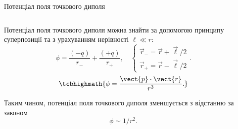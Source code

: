 \documentclass{beamer}
\begin{document}
\begin{frame}{Потенціал поля точкового диполя}{}
	\begin{columns}
		\begin{column}{0.7\linewidth}
			\begin{block}{}\justifying\small
				Потенціал поля точкового диполя можна знайти за допомогою принципу
				суперпозиції та з урахуванням нерівності $\ell \ll r$:
				\begin{equation*}
					\phi = \frac{(-q)}{r_-} +
					\frac{(+q)}{r_+}, \quad
					\begin{cases}
						\vec{r}_- =  \vec{r} + \vec{\ell}/2 \\
						\vec{r}_+ =  \vec{r} - \vec{\ell}/2
					\end{cases}.
				\end{equation*}
				\begin{equation*}
					\tcbhighmath{
						\phi = \frac{\vect{p}\cdot\vect{r}}{r^3}.
					}
				\end{equation*}

				Таким чином, потенціал поля точкового диполя зменшується з
				відстанню за законом
				\begin{equation*}
					\phi \sim 1/{r^2}.
				\end{equation*}
			\end{block}
		\end{column}
		\begin{column}{0.3\linewidth}
			\begin{column}{0.25\linewidth}\centering
				
			\end{column}
		\end{column}
	\end{columns}
\end{frame}
\end{document}
